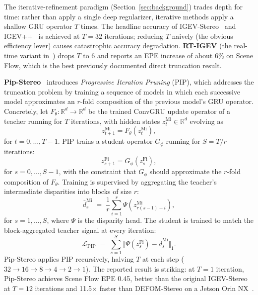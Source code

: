 The iterative-refinement paradigm (Section~\ref{sec:background}) trades depth for time: rather than apply a single deep regularizer, iterative methods apply a shallow GRU operator $T$ times. The headline accuracy of IGEV-Stereo~\cite{xu2023igev} and IGEV++~\cite{xu2025igevpp} is achieved at $T = 32$ iterations; reducing $T$ naively (the obvious efficiency lever) causes catastrophic accuracy degradation. \textbf{RT-IGEV} (the real-time variant in~\cite{xu2023igev}) drops $T$ to $6$ and reports an EPE increase of about 6\% on Scene Flow, which is the best previously documented direct truncation result.

\textbf{Pip-Stereo}~\cite{zheng2026pipstereo} introduces \emph{Progressive Iteration Pruning} (PIP), which addresses the truncation problem by training a sequence of models in which each successive model approximates an $r$-fold composition of the previous model's GRU operator. Concretely, let $F_\theta : \mathbb{R}^d \to \mathbb{R}^d$ be the trained ConvGRU update operator of a teacher running for $T$ iterations, with hidden states $z_t^{\mathrm{Mi}} \in \mathbb{R}^d$ evolving as
\begin{equation}
z_{t+1}^{\mathrm{Mi}} = F_\theta\!\left(z_t^{\mathrm{Mi}}\right),
\label{eq:mi_rnn}
\end{equation}
for $t = 0, \ldots, T-1$. PIP trains a student operator $G_\phi$ running for $S = T/r$ iterations:
\begin{equation}
z_{s+1}^{\mathrm{Fi}} = G_\phi\!\left(z_s^{\mathrm{Fi}}\right),
\label{eq:fi_rnn}
\end{equation}
for $s = 0, \ldots, S-1$, with the constraint that $G_\phi$ should approximate the $r$-fold composition of $F_\theta$. Training is supervised by aggregating the teacher's intermediate disparities into blocks of size $r$:
\begin{equation}
\bar{d}_s^{\mathrm{Mi}} \;=\; \frac{1}{r} \sum_{i=1}^{r} \Psi\!\left(z_{r(s-1)+i}^{\mathrm{Mi}}\right),
\label{eq:agg}
\end{equation}
for $s = 1, \ldots, S$, where $\Psi$ is the disparity head. The student is trained to match the block-aggregated teacher signal at every iteration:
\begin{equation}
\mathcal{L}_{\mathrm{PIP}} \;=\; \sum_{s=1}^{S} \bigl\Vert \Psi\!\left(z_s^{\mathrm{Fi}}\right) - \bar{d}_s^{\mathrm{Mi}} \bigr\Vert_1 .
\label{eq:pip_loss}
\end{equation}
Pip-Stereo applies PIP recursively, halving $T$ at each step ($32 \to 16 \to 8 \to 4 \to 2 \to 1$). The reported result is striking: at $T = 1$ iteration, Pip-Stereo achieves Scene Flow EPE 0.45, better than the original IGEV-Stereo at $T = 12$ iterations and 11.5$\times$ faster than DEFOM-Stereo on a Jetson Orin NX~\cite{zheng2026pipstereo}.

